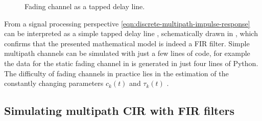 \begin{figure}
	\centering
	
	\caption{
		Fading channel as a tapped delay line.
		\label{fig:tapped-delay-line}
	}
\end{figure}

From a signal processing perspective \eqref{eqn:discrete-multipath-impulse-response} can be interpreted as a simple tapped delay line \cite{Messier, Gallager}, schematically drawn in , which confirms that the presented mathematical model is indeed a FIR filter. Simple multipath channels can be simulated with just a few lines of code, for example the data for the static fading channel in  is generated in just four lines of Python. The difficulty of fading channels in practice lies in the estimation of the constantly changing parameters \(c_k(t)\) and \(\tau_k(t)\) \cite{Messier}.

\subsection{Simulating multipath CIR with FIR filters} \label{sec:fractional-delay}

